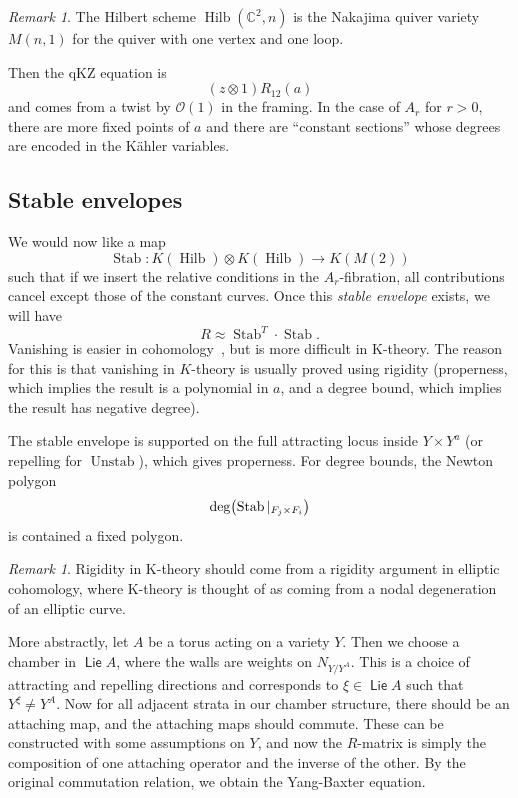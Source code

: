 \documentclass[leqno, openany]{memoir}
\theoremstyle{definition}
\theoremstyle{remark}
\newtheorem{rmk}[thm]{Remark}
\theoremstyle{plain}
\theoremstyle{definition}
\theoremstyle{remark}
\newcommand{\C}{\mathbb{C}}
\newcommand{\mc}[1]{\mathcal{#1}}
\newcommand{\mr}[1]{\mathrm{#1}}
\newcommand{\ms}[1]{\mathsf{#1}}
\newcommand{\on}[1]{\operatorname{#1}}
\DeclareMathOperator{\Hilb}{Hilb}
\begin{document}
\begin{rmk}
    The Hilbert scheme $\Hilb(\C^2, n)$ is the Nakajima quiver variety $M(n,1)$ for the quiver with one vertex and one loop.
\end{rmk}

Then the qKZ equation is
\[ (z \otimes 1)R_{12}(a) \]
and comes from a twist by $\mc{O}(1)$ in the framing. In the case of $A_r$ for $r > 0$, there are more fixed points of $a$ and there are ``constant sections'' whose degrees are encoded in the K\"ahler variables.

\subsection{Stable envelopes}

We would now like a map
\[ \on{Stab} \colon K(\Hilb) \otimes K(\Hilb) \to K(M(2)) \]
such that if we insert the relative conditions in the $A_r$-fibration, all contributions cancel except those of the constant curves. Once this \textit{stable envelope} exists, we will have
\[ R \approx \on{Stab}^T \cdot \on{Stab}. \]
Vanishing is easier in cohomology~\cite{qgqc}, but is more difficult in K-theory. The reason for this is that vanishing in $K$-theory is usually proved using rigidity (properness, which implies the result is a polynomial in $a$, and a degree bound, which implies the result has negative degree).

The stable envelope is supported on the full attracting locus inside $Y \times Y^a$ (or repelling for $\on{Unstab}$), which gives properness. For degree bounds, the Newton polygon
\[ \mr{deg}\qty(\on{Stab}|_{F_j \times F_i}) \]
is contained a fixed polygon.

\begin{rmk}
    Rigidity in K-theory should come from a rigidity argument in elliptic cohomology, where K-theory is thought of as coming from a nodal degeneration of an elliptic curve.
\end{rmk}

More abstractly, let $A$ be a torus acting on a variety $Y$. Then we choose a chamber in $\on{\ms{Lie}} A$, where the walls are weights on $N_{Y/Y^A}$. This is a choice of attracting and repelling directions and corresponds to $\xi \in \on{\ms{Lie}} A$ such that $Y^{\xi} \neq Y^A$. Now for all adjacent strata in our chamber structure, there should be an attaching map, and the attaching maps should commute. These can be constructed with some assumptions on $Y$, and now the $R$-matrix is simply the composition of one attaching operator and the inverse of the other. By the original commutation relation, we obtain the Yang-Baxter equation.
\end{document}
